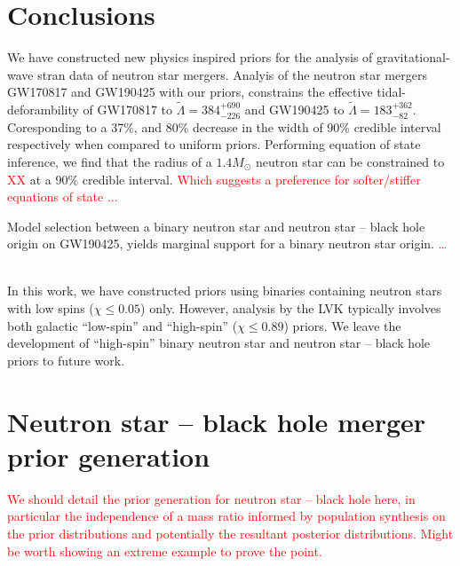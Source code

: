 \documentclass[twocolumn]{aastex631}
\newcommand{\red}[1]{\textcolor{red}{#1}}
\begin{document}
\section{Conclusions}
We have constructed new physics inspired priors for the analysis of gravitational-wave stran data of neutron star mergers. 
Analyis of the neutron star mergers GW170817 and GW190425 with our priors, constrains the effective tidal-deforambility of GW170817 to $\tilde{\Lambda} = 384^{+690}_{-226}$ and GW190425 to $\tilde{\Lambda} = 183^{+362}_{-82}$. Coresponding  
to a 37\%, and 80\% decrease in the width of 90\% credible interval respectively when compared to uniform priors. 
Performing equation of state inference, we find that the radius of a $1.4 M_\odot$ neutron star can be constrained to \red{XX} at a 90\% credible interval. \red{Which suggests a preference for softer/stiffer equations of state ...}
	\

Model selection between a binary neutron star and neutron star -- black hole origin on GW190425, yields marginal support for a binary neutron star origin. \red{\ldots}
	\

In this work, we have constructed priors using binaries containing neutron stars with low spins ($\chi \leq 0.05$) only. However, analysis by the LVK typically involves both galactic ``low-spin'' and ``high-spin'' ($\chi \leq 0.89$) priors. We leave the development of ``high-spin'' binary neutron star and neutron star -- black hole priors to future work. 
\appendix
	
\section{Neutron star -- black hole merger prior generation}\label{sec:NSBH generation}
	
\red{We should detail the prior generation for neutron star -- black hole here, in particular the independence of a mass ratio informed by population synthesis on the prior distributions and potentially the resultant posterior distributions. Might be worth showing an extreme example to prove the point.}
	
\end{document}
